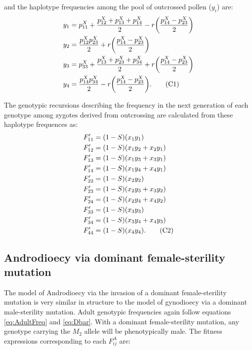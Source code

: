 \documentclass{article}
\newcommand\numberthis{\addtocounter{equation}{1}\tag{\theequation}}
\begin{document}
\noindent and the haplotype frequencies among the pool of outcrossed pollen ($y_i$) are:
\begin{align*} 
    y_{1} &= p^X_{11} + \frac{p^X_{12} + p^X_{13} + p^X_{14}}{2} - r \bigg( \frac{p^X_{14} - p^X_{23}}{2} \bigg)  \\
    y_{2} &= \frac{p^X_{12} p^X_{23}}{2} + r \bigg( \frac{p^X_{14} - p^X_{23}}{2} \bigg) \\
    y_{3} &= p^X_{33} + \frac{p^X_{13} + p^X_{23} + p^X_{34}}{2} + r \bigg( \frac{p^X_{14} - p^X_{23}}{2} \bigg)  \\
    y_{4} &= \frac{p^X_{14} p^X_{34}}{2} - r \bigg( \frac{p^X_{14} - p^X_{23}}{2} \bigg).  \numberthis
\end{align*}

\noindent The genotypic recursions describing the frequency in the next generation of each genotype among zygotes derived from outcrossing are calculated from these haplotype frequences as:
\begin{align*} \label{eq:GynRecOutRecs}
    F'_{11} &= (1 - S) (x_1 y_1)  \\
    F'_{12} &= (1 - S) (x_1 y_2 + x_2 y_1)  \\
    F'_{13} &= (1 - S) (x_1 y_3 + x_3 y_1)  \\
    F'_{14} &= (1 - S) (x_1 y_4 + x_4 y_1)  \\
    F'_{22} &= (1 - S) (x_2 y_2) \\
    F'_{23} &= (1 - S) (x_2 y_3 + x_3 y_2)  \\
    F'_{24} &= (1 - S) (x_2 y_4 + x_4 y_2) \\
    F'_{33} &= (1 - S) (x_3 y_3)  \\
    F'_{34} &= (1 - S) (x_3 y_4 + x_4 y_3)  \\
    F'_{44} &= (1 - S) (x_4 y_4). \numberthis
\end{align*}







\newpage{}
\subsection*{Androdioecy via dominant female-sterility mutation}

The model of Androdioecy via the invasion of a dominant female-sterility mutation is very similar in structure to the model of gynodioecy via a dominant male-sterility mutation. Adult genotypic frequencies again follow equations \ref{eq:AdultFreq} and \ref{eq:Dbar}. With a dominant female-sterility mutation, any genotype carrying the $M_2$ allele will be phenotypically male. The fitness expressions corresponding to each $F^A_{ij}$ are:
\end{document}
